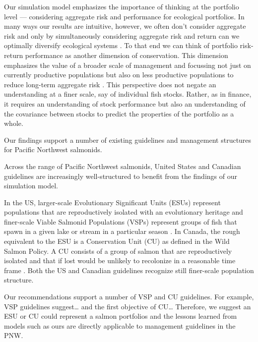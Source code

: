 Our simulation model emphasizes the importance of thinking at the portfolio level --- considering aggregate risk and performance for ecological portfolios. In many ways our results are intuitive, however, we often don't consider aggregate risk and only by simultaneously considering aggregate risk and return can we optimally diversify ecological systems \citep{ando2012}. To that end we can think of portfolio risk-return performance as another dimension of conservation. This dimension emphasizes the value of a broader scale of management and focussing not just on currently productive populations but also on less productive populations to reduce long-term aggregate risk \citep{hilborn2003}. This perspective does not negate an understanding at a finer scale, say of individual fish stocks. Rather, as in finance, it requires an understanding of stock performance but also an understanding of the covariance between stocks to predict the properties of the portfolio as a whole.

Our findings support a number of existing guidelines and management structures for Pacific Northwest salmonids.

Across the range of Pacific Northwest salmonids, United States and Canadian guidelines are increasingly well-structured to benefit from the findings of our simulation model.

In the US, larger-scale Evolutionary Significant Units (ESUs) represent populations that are reproductively isolated with an evolutionary heritage \citep{waples1991, moritz1994} and finer-scale Viable Salmonid Populations (VSPs) represent groups of fish that spawn in a given lake or stream in a particular season \citep{mceacheran2000}. In Canada, the rough equivalent to the ESU is a Conservation Unit (CU) as defined in the Wild Salmon Policy. A CU consists of a group of salmon that are reproductively isolated and that if lost would be unlikely to recolonize in a reasonable time frame \citep{dfo2005wsp}. Both the US and Canadian guidelines recognize still finer-scale population structure.

Our recommendations support a number of VSP and CU guidelines. For example, VSP guidelines suggest\ldots{} and the first objective of CU\ldots{} Therefore, we suggest an ESU or CU could represent a salmon portfolios and the lessons learned from models such as ours are directly applicable to management guidelines in the PNW.

